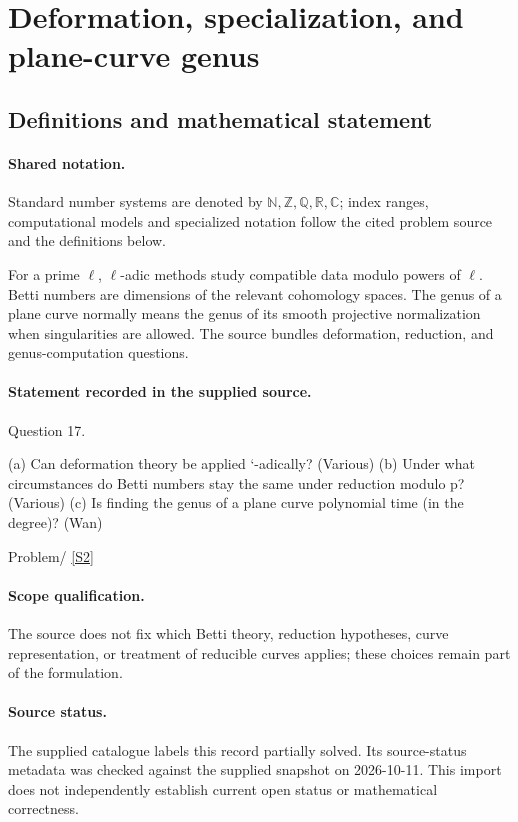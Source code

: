 \documentclass[11pt]{article}
\newcommand{\sref}[2]{\hyperlink{source:#1:#2}{[S#2]}}
\begin{document}
\section{Deformation, specialization, and plane-curve genus}\label{statement}

\subsection{Definitions and mathematical statement}

\paragraph{Shared notation.}Standard number systems are denoted by $\mathbb N,\mathbb Z,\mathbb Q,\mathbb R,\mathbb C$; index ranges, computational models and specialized notation follow the cited problem source and the definitions below.


For a prime $\ell$, $\ell$-adic methods study compatible data modulo powers of $\ell$. Betti numbers are dimensions of the relevant cohomology spaces. The genus of a plane curve normally means the genus of its smooth projective normalization when singularities are allowed. The source bundles deformation, reduction, and genus-computation questions.
\paragraph{Statement recorded in the supplied source.}
Question 17.

(a) Can deformation theory be applied `-adically? (Various) (b) Under what circumstances do Betti numbers stay the same under reduction modulo p?(Various) (c) Is finding the genus of a plane curve polynomial time (in the degree)? (Wan)

Problem/ \sref{statement}{2}
\paragraph{Scope qualification.}
The source does not fix which Betti theory, reduction hypotheses, curve representation, or treatment of reducible curves applies; these choices remain part of the formulation.
\paragraph{Source status.}
The supplied catalogue labels this record partially solved. Its source-status metadata was checked against the supplied snapshot on 2026-10-11. This import does not independently establish current open status or mathematical correctness.
\end{document}
